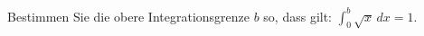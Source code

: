 \begin{ExerciseBlock}
Bestimmen Sie die obere Integrationsgrenze $b$ so, dass gilt: $\displaystyle \int_0^b \sqrt{x}\,dx=1$.

\end{ExerciseBlock}
